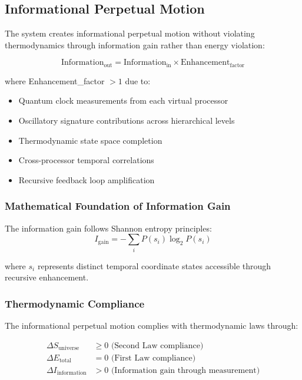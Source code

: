 \documentclass[12pt,a4paper]{article}
\begin{document}
\subsection{Informational Perpetual Motion}

The system creates informational perpetual motion without violating thermodynamics through information gain rather than energy violation:

\begin{equation}
\text{Information}_{\text{out}} = \text{Information}_{\text{in}} \times \text{Enhancement}_{\text{factor}}
\end{equation}

where Enhancement\_factor $> 1$ due to:
\begin{itemize}
\item Quantum clock measurements from each virtual processor
\item Oscillatory signature contributions across hierarchical levels
\item Thermodynamic state space completion
\item Cross-processor temporal correlations
\item Recursive feedback loop amplification
\end{itemize}

\subsubsection{Mathematical Foundation of Information Gain}

The information gain follows Shannon entropy principles:
$$I_{\text{gain}} = -\sum_{i} P(s_i) \log_2 P(s_i)$$

where $s_i$ represents distinct temporal coordinate states accessible through recursive enhancement.

\subsubsection{Thermodynamic Compliance}

The informational perpetual motion complies with thermodynamic laws through:

\begin{align}
\Delta S_{\text{universe}} &\geq 0 \text{ (Second Law compliance)} \\
\Delta E_{\text{total}} &= 0 \text{ (First Law compliance)} \\
\Delta I_{\text{information}} &> 0 \text{ (Information gain through measurement)}
\end{align}
\end{document}
